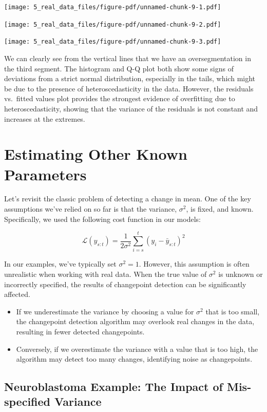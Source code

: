 \documentclass[
  letterpaper,
  DIV=11,
  numbers=noendperiod]{scrreprt}
\providecommand{\tightlist}{%
  \setlength{\itemsep}{0pt}\setlength{\parskip}{0pt}}\usepackage{longtable,booktabs,array}
\begin{document}
\texttt{[image: 5\_real\_data\_files/figure-pdf/unnamed-chunk-9-1.pdf]}

\texttt{[image: 5\_real\_data\_files/figure-pdf/unnamed-chunk-9-2.pdf]}

\texttt{[image: 5\_real\_data\_files/figure-pdf/unnamed-chunk-9-3.pdf]}

We can clearly see from the vertical lines that we have an
oversegmentation in the third segment. The histogram and Q-Q plot both
show some signs of deviations from a strict normal distribution,
especially in the tails, which might be due to the presence of
heteroscedasticity in the data. However, the residuals vs.~fitted values
plot provides the strongest evidence of overfitting due to
heteroscedasticity, showing that the variance of the residuals is not
constant and increases at the extremes.

\section{Estimating Other Known
Parameters}\label{estimating-other-known-parameters}

Let's revisit the classic problem of detecting a change in mean. One of
the key assumptions we've relied on so far is that the variance,
\(\sigma^2\), is fixed, and known. Specifically, we used the following
cost function in our models:

\[
\mathcal{L}(y_{s:t}) = \frac{1}{2\sigma^2}  \sum_{i = s}^{t} \left ( y_i - \bar{y}_{s:t} \right)^2
\]

In our examples, we've typically set \(\sigma^2 = 1\). However, this
assumption is often unrealistic when working with real data. When the
true value of \(\sigma^2\) is unknown or incorrectly specified, the
results of changepoint detection can be significantly affected.

\begin{itemize}
\tightlist
\item
  If we underestimate the variance by choosing a value for \(\sigma^2\)
  that is too small, the changepoint detection algorithm may overlook
  real changes in the data, resulting in fewer detected changepoints.
\item
  Conversely, if we overestimate the variance with a value that is too
  high, the algorithm may detect too many changes, identifying noise as
  changepoints.
\end{itemize}

\subsection{Neuroblastoma Example: The Impact of Mis-specified
Variance}\label{neuroblastoma-example-the-impact-of-mis-specified-variance}
\end{document}
